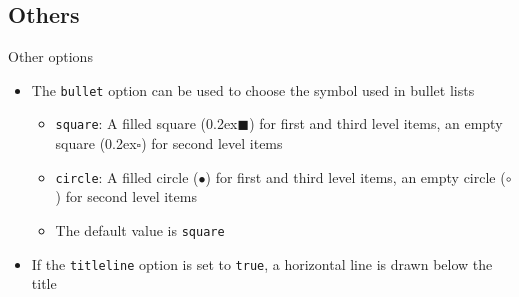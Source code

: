 \subsection{Others}
\begin{frame}[t,fragile]{Other options}
\begin{itemize}
  \item The \verb!bullet! option can be used to choose the symbol used in
      bullet lists
    \begin{itemize}
    \item \verb!square!: A filled square
      ({\tiny\raise0.2ex\hbox{$\blacksquare$}}) for
      first and third level items, an empty square
      ({\tiny\raise0.2ex\hbox{$\square$}}) for
      second level items
    \item \verb!circle!: A filled circle ({$\bullet$})
      for first and third level items, an empty circle
      ({$\circ$}) for second level items
    \item The default value is \verb!square!
    \end{itemize}
  \item If the \verb!titleline! option is set to \verb!true!, a horizontal line
      is drawn below the title
\end{itemize}
\end{frame}
